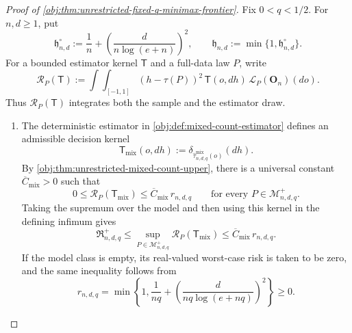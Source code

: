\begin{proof}[Proof of \cref{obj:thm:unrestricted-fixed-q-minimax-frontier}]
Fix \(0<q<1/2\). For \(n,d\ge1\), put
\[
\mathfrak h_{n,d}^{\circ}
:=
\frac1n+\left(\frac{d}{n\log(e+n)}\right)^2,
\qquad
\mathfrak h_{n,d}:=\min\{1,\mathfrak h_{n,d}^{\circ}\}.
\]
For a bounded estimator kernel \(\mathsf T\) and a full-data law \(P\), write
\[
\mathcal R_P(\mathsf T)
:=
\int\!\int_{[-1,1]}
(h-\tau(P))^2\,\mathsf T(o,dh)\,
\mathcal L_P(\mathbf O_n)(do).
\]
Thus \(\mathcal R_P(\mathsf T)\) integrates both the sample and the estimator draw.

\begin{enumerate}
\item
The deterministic estimator in \cref{obj:def:mixed-count-estimator} defines an admissible decision kernel
\[
\mathsf T_{\mathrm{mix}}(o,dh)
:=
\delta_{\widehat\tau^{\mathrm{mix}}_{n,d,q}(o)}(dh).
\]
By \cref{obj:thm:unrestricted-mixed-count-upper}, there is a universal constant \(\overline C_{\mathrm{mix}}>0\) such that
\[
0\le \mathcal R_P(\mathsf T_{\mathrm{mix}})
\le \overline C_{\mathrm{mix}}\,r_{n,d,q}
\qquad
\text{for every }P\in\mathcal M^+_{n,d,q}.
\]
Taking the supremum over the model and then using this kernel in the defining infimum gives
\[
\mathfrak R^+_{n,d,q}
\le
\sup_{P\in\mathcal M^+_{n,d,q}}
\mathcal R_P(\mathsf T_{\mathrm{mix}})
\le
\overline C_{\mathrm{mix}}\,r_{n,d,q}.
\]
If the model class is empty, its real-valued worst-case risk is taken to be zero, and the same inequality follows from
\[
r_{n,d,q}
=
\min\left\{1,\frac1{nq}
+\left(\frac{d}{nq\log(e+nq)}\right)^2\right\}
\ge0.
\]


\end{enumerate}
\end{proof}
